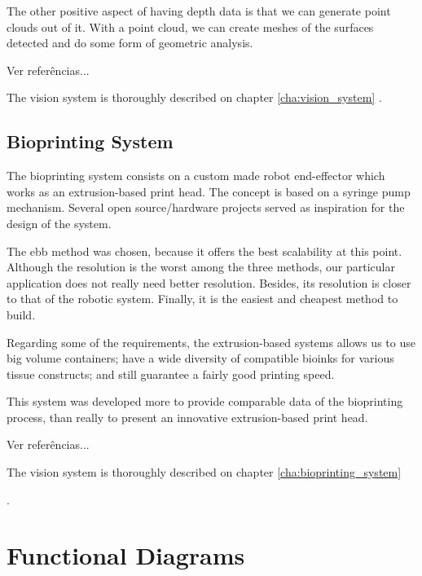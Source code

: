 The other positive aspect of having depth data is that we can generate point clouds out of it. With a point cloud, we can create meshes of the surfaces detected and do some form of geometric analysis.

{\color{red} Ver referências...}

The vision system is thoroughly described on chapter \ref{cha:vision_system}
.


\subsection*{Bioprinting System}
\label{subsec:system_architecture_components_bioprinting_system}

The bioprinting system consists on a custom made robot end-effector which works as an extrusion-based print head. The concept is based on a syringe pump mechanism. Several open source/hardware projects served as inspiration for the design of the system.

The \gls{ebb} method was chosen, because it offers the best scalability at this point. Although the resolution is the worst among the three methods, our particular application does not really need better resolution. Besides, its resolution is closer to that of the robotic system. Finally, it is the easiest and cheapest method to build.

Regarding some of the requirements, the extrusion-based systems allows us to use big volume containers; have a wide diversity of compatible bioinks for various tissue constructs; and still guarantee a fairly good printing speed.

This system was developed more to provide comparable data of the bioprinting process, than really to present an innovative extrusion-based print head.

{\color{red} Ver referências...}

The vision system is thoroughly described on chapter \ref{cha:bioprinting_system}


.

\section{Functional Diagrams}
\label{sec:system_architecture_functional_diagrams}

